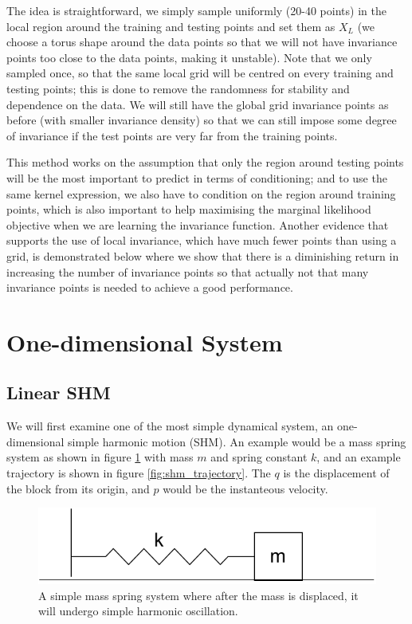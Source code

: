 \documentclass{statsmsc}
\begin{document}
The idea is straightforward, we simply sample uniformly (20-40 points) in the local region around the training and testing points and set them as $X_L$ (we choose a torus shape around the data points so that we will not have invariance points too close to the data points, making it unstable).
Note that we only sampled once, so that the same local grid will be centred on every training and testing points; this is done to remove the randomness for stability and dependence on the data.
We will still have the global grid invariance points as before (with smaller invariance density) so that we can still impose some degree of invariance if the test points are very far from the training points.

This method works on the assumption that only the region around testing points will be the most important to predict in terms of conditioning; and to use the same kernel expression, we also have to condition on the region around training points, which is also important to help maximising the marginal likelihood objective when we are learning the invariance function.
Another evidence that supports the use of local invariance, which have much fewer points than using a grid, is demonstrated below where we show that there is a diminishing return in increasing the number of invariance points so that actually not that many invariance points is needed to achieve a good performance. 

\section{One-dimensional System}
\subsection{Linear SHM}
We will first examine one of the most simple dynamical system, an one-dimensional simple harmonic motion (SHM). 
An example would be a mass spring system as shown in figure \ref{fig:shm_diagram} with mass $m$ and spring constant $k$, and an example trajectory is shown in figure \ref{fig:shm_trajectory}. 
The $q$ is the displacement of the block from its origin, and $p$ would be the instanteous velocity.

\begin{figure}[H]
        \centering
        \includegraphics[width=0.3\linewidth]{../figures/shm.pdf}
        \caption{A simple mass spring system where after the mass is displaced, it will undergo simple harmonic oscillation.}
        \label{fig:shm_diagram}
\end{figure}
\end{document}
